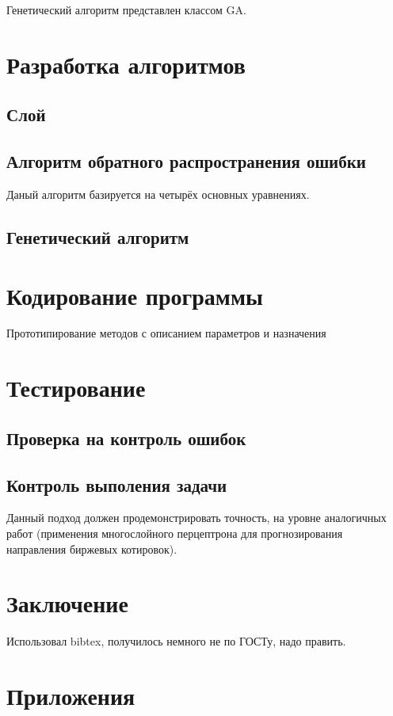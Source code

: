\documentclass[a4paper,12pt]{article}
\begin{document}
Генетический алгоритм представлен классом GA.

\newpage\section{Разработка алгоритмов}

\subsection{Слой}

\subsection{Алгоритм обратного распространения ошибки}
Даный алгоритм базируется на четырёх основных уравнениях.

\subsection{Генетический алгоритм}

\newpage\section{Кодирование программы}
Прототипирование методов с описанием параметров и назначения

\newpage\section{Тестирование}
\subsection{Проверка на контроль ошибок}
\subsection{Контроль выполения задачи}
Данный подход должен продемонстрировать точность, на уровне аналогичных работ (применения многослойного перцептрона для прогнозирования направления биржевых котировок).

\newpage\section*{Заключение}


\newpage
\renewcommand\refname{Список использованных источников}
Использовал bibtex, получилось немного не по ГОСТу, надо править.
\nocite{*}


\newpage\section*{Приложения}
\end{document}
